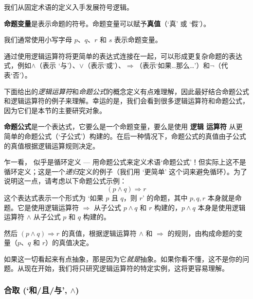 我们从固定术语的定义入手发展符号逻辑。

\begin{definition}
\label{defPropositionalVariable}
\textbf{命题变量}是表示命题的符号。命题变量可以赋予\textbf{真值}（`真' 或 `假'）。
\end{definition}

我们通常使用小写字母 $p$、$q$、$r$ 和 $s$ 表示命题变量。

通过使用逻辑运算符将更简单的表达式连接在一起，可以形成更复杂命题的表达式，例如$\wedge$（表示 `与'）、$\vee$（表示`或'）、$\Rightarrow$（表示`如果\dots{}那么\dots{}'）和$\neg $（代表`否'）。

下面给出的\textit{逻辑运算符}和\textit{命题公式}的概念定义有点难理解，因此最好结合命题公式和逻辑运算符的例子来理解。幸运的是，我们会看到很多逻辑运算符和命题公式，因为它们是本节的主要研究对象。

\begin{definition}
\label{defPropositionalFormula}
\label{defLogicalOperator}
\textbf{命题公式}是一个表达式，它要么是一个命题变量，要么是使用 \textbf{\mbox{逻辑} \mbox{运算符}} 从更简单的命题公式（`子公式'）构建的。在后一种情况下，命题公式的真值由子公式的真值根据逻辑运算规则决定。
\end{definition}

乍一看， 似乎是循环定义 --- 用命题公式来定义术语`命题公式'！但实际上这不是循环定义；这是一个\textit{递归}定义的例子（我们用 `更简单' 这个词来避免循环）。为了说明这一点，请考虑以下命题公式示例：
\[
(p \wedge q) \Rightarrow r
\]
这个表达式表示一个形式为 `如果 $p$ 且 $q$，则 $r$' 的命题，其中 $p,q,r$ 本身就是命题。它是使用逻辑运算符 $\Rightarrow$ 从子公式 $p \wedge q$ 和 $r$ 构建的，$p \wedge q$ 本身是使用逻辑运算符 $\wedge$ 从子公式 $p$ 和 $q$ 构建的。

然后 $(p \wedge q) \Rightarrow r$ 的真值，根据逻辑运算符 $\wedge$ 和 $\Rightarrow$ 的规则，由构成命题的变量（$p$、$q$ 和 $r$）的真值决定。

如果这一切看起来有点抽象，那是因为它\textit{就是}抽象。如果你看不懂，这不是你的问题。从现在开始，我们将只研究逻辑运算符的特定实例，这将更容易理解。

\subsubsection*{合取 (`和/且/与', $\wedge$)}

